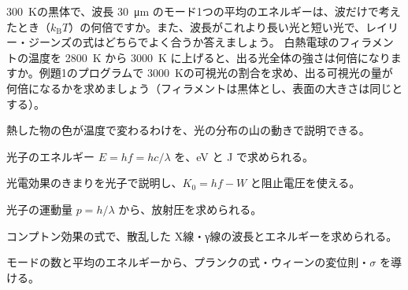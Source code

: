 \bkproblem \qty{300}{K}の黒体で、波長 \qty{30}{\micro m} のモード1つの平均のエネルギーは、波だけで考えたとき（$k_{\mathrm B}T$）の何倍ですか。また、波長がこれより長い光と短い光で、レイリー・ジーンズの式はどちらでよく合うか答えましょう。
\bkproblem 白熱電球のフィラメントの温度を \qty{2800}{K} から \qty{3000}{K} に上げると、出る光全体の強さは何倍になりますか。例題1のプログラムで \qty{3000}{K}の可視光の割合を求め、出る可視光の量が何倍になるかを求めましょう（フィラメントは黒体とし、表面の大きさは同じとする）。

\begin{furikaeri}
\begin{checklist}
\item 熱した物の色が温度で変わるわけを、光の分布の山の動きで説明できる。
\item 光子のエネルギー $E=hf=hc/\lambda$ を、eV と J で求められる。
\item 光電効果のきまりを光子で説明し、$K_0=hf-W$ と阻止電圧を使える。
\item 光子の運動量 $p=h/\lambda$ から、放射圧を求められる。
\item コンプトン効果の式で、散乱した X線・γ線の波長とエネルギーを求められる。
\item モードの数と平均のエネルギーから、プランクの式・ウィーンの変位則・$\sigma$ を導ける。
\end{checklist}
\end{furikaeri}
